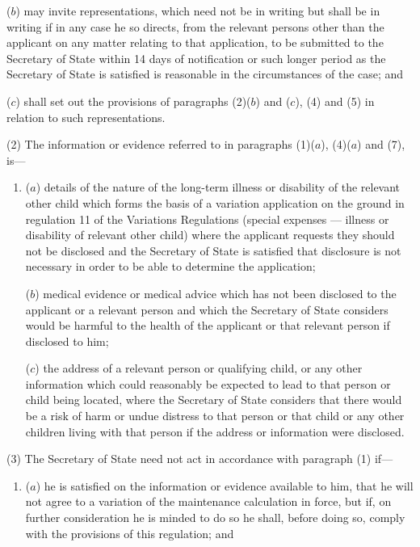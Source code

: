 \documentclass[12pt,a4paper]{article}
\begin{document}
{\begin{enumerate}
($b$) may invite representations, which need not be in writing but shall be in writing if in any case he so directs, from the relevant persons other than the applicant on any matter relating to that application, to be submitted to the Secretary of State within 14 days of notification or such longer period as the Secretary of State is satisfied is reasonable in the circumstances of the case; and

($c$) shall set out the provisions of paragraphs (2)($b$)  and ($c$), (4) and (5) in relation to such representations.
\end{enumerate}

(2) The information or evidence referred to in paragraphs (1)($a$), (4)($a$)  and (7), is—
\begin{enumerate}\item[]
($a$) details of the nature of the long-term illness or disability of the relevant other child which forms the basis of a variation application on the ground in regulation 11 of the Variations Regulations (special expenses — illness or disability of relevant other child) where the applicant requests they should not be disclosed and the Secretary of State is satisfied that disclosure is not necessary in order to be able to determine the application;

($b$) medical evidence or medical advice which has not been disclosed to the applicant or a relevant person and which the Secretary of State considers would be harmful to the health of the applicant or that relevant person if disclosed to him;

($c$) the address of a relevant person or qualifying child, or any other information which could reasonably be expected to lead to that person or child being located, where the Secretary of State considers that there would be a risk of harm or undue distress to that person or that child or any other children living with that person if the address or information were disclosed.
\end{enumerate}

(3) The Secretary of State need not act in accordance with paragraph (1) if—
\begin{enumerate}\item[]
($a$) he is satisfied on the information or evidence available to him, that he will not agree to a variation of the maintenance calculation in force, but if, on further consideration he is minded to do so he shall, before doing so, comply with the provisions of this regulation; and


\end{enumerate}}
\end{document}
